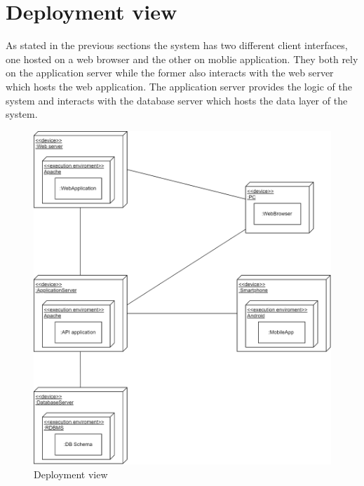 \section{Deployment view}
As stated in the previous sections the system has two different client interfaces, one hosted on a web browser and the other on moblie application. They both rely on the application server while the former also interacts with the web server which hosts the web application.
The application server provides the logic of the system and interacts with the database server which hosts the data layer of the system.
\begin{figure}[H]
\caption{Deployment view}
\centering
\includegraphics[width = \textwidth]{sections/architecturalDesign/DeploymentView.png}
\end{figure}
